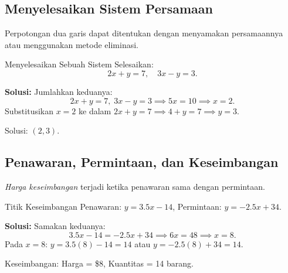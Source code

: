 \subsection*{Menyelesaikan Sistem Persamaan}
Perpotongan dua garis dapat ditentukan dengan menyamakan persamaannya atau menggunakan metode eliminasi.

\begin{example}{Menyelesaikan Sebuah Sistem}\label{exa:system-solve}
Selesaikan:
\[
2x+y=7,\quad 3x-y=3.
\]

\textbf{Solusi:} Jumlahkan keduanya:
\[
2x+y=7,\;3x-y=3 \implies 5x=10 \implies x=2.
\]
Substitusikan $x=2$ ke dalam $2x+y=7 \implies 4+y=7 \implies y=3.$

Solusi: $(2,3)$.
\end{example}

\subsection*{Penawaran, Permintaan, dan Keseimbangan}
\emph{Harga keseimbangan} terjadi ketika penawaran sama dengan permintaan.

\begin{example}{Titik Keseimbangan}\label{exa:equilibrium}
Penawaran: $y=3.5x-14$, Permintaan: $y=-2.5x+34$.

\textbf{Solusi:} Samakan keduanya:
\[
3.5x-14=-2.5x+34 \implies 6x=48 \implies x=8.
\]
Pada $x=8$: $y=3.5(8)-14=14$ atau $y=-2.5(8)+34=14$.

Keseimbangan: Harga = \$8, Kuantitas = 14 barang.

\begin{center}
\par{}\label{fig:equations-and-lines-new-tikz09}%

\end{center}
\end{example}

